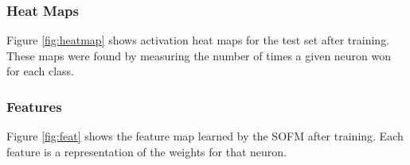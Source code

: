 \documentclass[a4paper, 12pt, titlepage]{article}
\newcommand{\figRef}[1]{Figure \ref{#1}}
\begin{document}
  \subsubsection{Heat Maps}
  \par \figRef{fig:heatmap} shows activation heat maps for the test set after
  training.
  These maps were found by measuring the number of times a given neuron won for
  each class.

  \subsubsection{Features}
  \par \figRef{fig:feat} shows the feature map learned by the SOFM after
  training.
  Each feature is a representation of the weights for that neuron.
\end{document}
